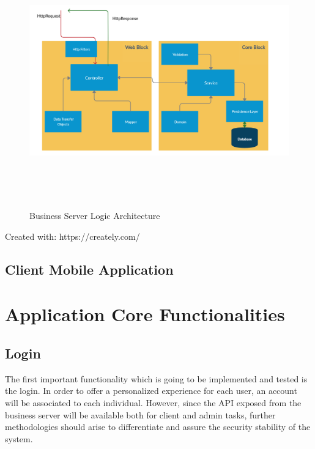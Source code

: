 \begin{figure}[H]
\centering
\includegraphics[height=11cm]{images/BusinessServerArchitecture.png} 
\caption{Business Server Logic Architecture}
\label{fig:businessserverarchitecture}
\end{figure}
\begin{flushright}
Created with: https://creately.com/
\end{flushright}




\subsection{Client Mobile Application}

\section{Application Core Functionalities}

\subsection{Login}
The first important functionality which is going to be implemented and tested is the login. In order to offer a personalized experience for each user, an account will be associated to each individual. However, since the API exposed from the business server will be available both for client and admin tasks, further methodologies should arise to differentiate and assure the security stability of the system.

